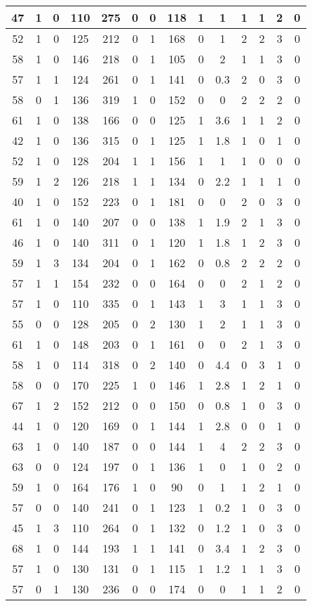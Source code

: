 \documentclass{article}
\begin{document}
\begin{tabular}{
|c|c|c|c|c|c|c|c|c|c|c|c|c|c|}
\hline
47&1&0&110&275&0&0&118&1&1&1&1&2&0 \\
\hline
52&1&0&125&212&0&1&168&0&1&2&2&3&0 \\
\hline
58&1&0&146&218&0&1&105&0&2&1&1&3&0 \\
\hline
57&1&1&124&261&0&1&141&0&0.3&2&0&3&0 \\
\hline
58&0&1&136&319&1&0&152&0&0&2&2&2&0 \\
\hline
61&1&0&138&166&0&0&125&1&3.6&1&1&2&0 \\
\hline
42&1&0&136&315&0&1&125&1&1.8&1&0&1&0 \\
\hline
52&1&0&128&204&1&1&156&1&1&1&0&0&0 \\
\hline
59&1&2&126&218&1&1&134&0&2.2&1&1&1&0 \\
\hline
40&1&0&152&223&0&1&181&0&0&2&0&3&0 \\
\hline
61&1&0&140&207&0&0&138&1&1.9&2&1&3&0 \\
\hline
46&1&0&140&311&0&1&120&1&1.8&1&2&3&0 \\
\hline
59&1&3&134&204&0&1&162&0&0.8&2&2&2&0 \\
\hline
57&1&1&154&232&0&0&164&0&0&2&1&2&0 \\
\hline
57&1&0&110&335&0&1&143&1&3&1&1&3&0 \\
\hline
55&0&0&128&205&0&2&130&1&2&1&1&3&0 \\
\hline
61&1&0&148&203&0&1&161&0&0&2&1&3&0 \\
\hline
58&1&0&114&318&0&2&140&0&4.4&0&3&1&0 \\
\hline
58&0&0&170&225&1&0&146&1&2.8&1&2&1&0 \\
\hline
67&1&2&152&212&0&0&150&0&0.8&1&0&3&0 \\
\hline
44&1&0&120&169&0&1&144&1&2.8&0&0&1&0 \\
\hline
63&1&0&140&187&0&0&144&1&4&2&2&3&0 \\
\hline
63&0&0&124&197&0&1&136&1&0&1&0&2&0 \\
\hline
59&1&0&164&176&1&0&90&0&1&1&2&1&0 \\
\hline
57&0&0&140&241&0&1&123&1&0.2&1&0&3&0 \\
\hline
45&1&3&110&264&0&1&132&0&1.2&1&0&3&0 \\
\hline
68&1&0&144&193&1&1&141&0&3.4&1&2&3&0 \\
\hline
57&1&0&130&131&0&1&115&1&1.2&1&1&3&0 \\
\hline
57&0&1&130&236&0&0&174&0&0&1&1&2&0 \\
\hline
\end{tabular}
\end{document}
